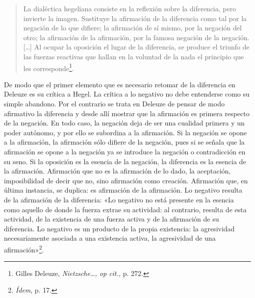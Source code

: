 \begin{quote}
La dialéctica hegeliana consiste en la reflexión sobre la diferencia, pero invierte la imagen. Sustituye la afirmación de la diferencia como tal por la negación de lo que difiere; la afirmación de sí mismo, por la negación del otro; la afirmación de la afirmación, por la famosa negación de la negación. {[}\ldots{]} Al ocupar la oposición el lugar de la diferencia, se produce el triunfo de las fuerzas reactivas que hallan en la voluntad de la nada el principio que les corresponde\footnote{Gilles Deleuze, \emph{Nietzsche\ldots, op cit.,} p. 272.}.
\end{quote}

De modo que el primer elemento que es necesario retomar de la diferencia en Deleuze es su crítica a Hegel. La crítica a lo negativo no debe entenderse como su simple abandono. Por el contrario se trata en Deleuze de pensar de modo afirmativo la diferencia y desde allí mostrar que la afirmación es primera respecto de la negación. En todo caso, la negación deja de ser una cualidad primera y un poder autónomo, y por ello se subordina a la afirmación. Si la negación se opone a la afirmación, la afirmación sólo difiere de la negación, pues si se señala que la afirmación se opone a la negación ya se introduce la negación o contradicción en su seno. Si la oposición es la esencia de la negación, la diferencia es la esencia de la afirmación. Afirmación que no es la afirmación de lo dado, la aceptación, imposibilidad de decir que no, sino afirmación como creación. Afirmación que, en última instancia, se duplica: es afirmación de la afirmación. Lo negativo resulta de la afirmación de la diferencia: «Lo negativo no está presente en la esencia como aquello de donde la fuerza extrae su actividad: al contrario, resulta de esta actividad, de la existencia de una fuerza activa y de la afirmación de su diferencia. Lo negativo es un producto de la propia existencia: la agresividad necesariamente asociada a una existencia activa, la agresividad de una afirmación»\footnote{\emph{Ídem}, p. 17.}.

